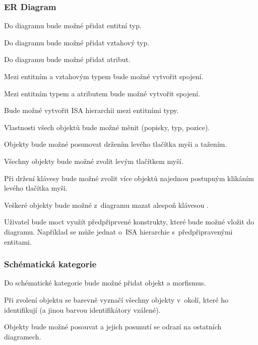 \subsubsection*{ER Diagram}

\begin{enumfp}[resume]
  \item Do diagramu bude možné přidat entitní typ.
  \item Do diagramu bude možné přidat vztahový typ.
  \item Do diagramu bude možné přidat atribut.
  \item Mezi entitním a vztahovým typem bude možné vytvořit spojení.
  \item Mezi entitním typem a atributem bude možné vytvořit spojení.
  \item Bude možné vytvořit ISA hierarchii mezi entitními typy.
  \item Vlastnosti všech objektů bude možné měnit (popisky, typ, pozice).
  \item Objekty bude možné posunovat držením levého tlačítka myši a tažením.
  \item Všechny objekty bude možné zvolit levým tlačítkem myší.
  \item Při držení klávesy \keys{\ctrl} bude možné zvolit více objektů najednou postupným klikáním levého tlačítka myši.
  \item Veškeré objekty bude možné z~diagramu mazat alespoň klávesou .
  \item Uživatel bude moct využít předpřiprvené konstrukty, které bude možné vložit do diagramu.
  Například se může jednat o~ISA hierarchie s~předpřipravenými entitami.
\end{enumfp}

\subsubsection*{Schématická kategorie}

\begin{enumfp}[resume]
  \item Do schématické kategorie bude možné přidat objekt a morfismus.
  \item Při zvolení objektu se barevně vyznačí všechny objekty v~okolí, které ho identifikují (a jinou barvou identifikátory vzálené).
  \item Objekty bude možné posouvat a jejich posunutí se odrazí na ostatních diagramech.
\end{enumfp}

